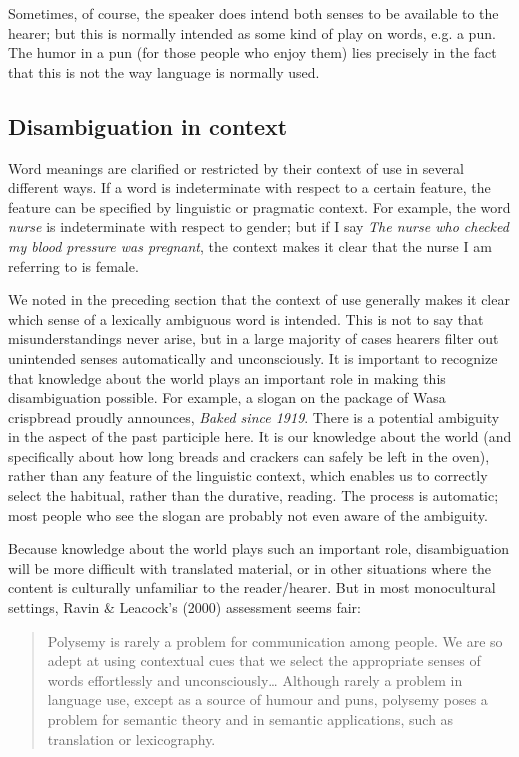 Sometimes, of course, the speaker does intend both senses to be available to the hearer; but this is normally intended as some kind of play on words, e.g. a pun. The humor in a pun (for those people who enjoy them) lies precisely in the fact that this is not the way language is normally used.


\subsection{Disambiguation in context}\label{sec:} %

Word meanings are clarified or restricted by their context of use in several different ways. If a word is indeterminate with respect to a certain feature, the feature can be specified by linguistic or pragmatic context. For example, the word \textit{nurse} is indeterminate with respect to gender; but if I say \textit{The nurse who checked my blood pressure was pregnant}, the context makes it clear that the nurse I am referring to is female.



We noted in the preceding section that the context of use generally makes it clear which sense of a lexically ambiguous word is intended. This is not to say that misunderstandings never arise, but in a large majority of cases hearers filter out unintended senses automatically and unconsciously. It is important to recognize that knowledge about the world plays an important role in making this disambiguation possible. For example, a slogan on the package of Wasa crispbread proudly announces, \textit{Baked since 1919}. There is a potential ambiguity in the aspect of the past participle here. It is our knowledge about the world (and specifically about how long breads and crackers can safely be left in the oven), rather than any feature of the linguistic context, which enables us to correctly select the habitual, rather than the durative, reading. The process is automatic; most people who see the slogan are probably not even aware of the ambiguity.



Because knowledge about the world plays such an important role, disambiguation will be more difficult with translated material, or in other situations where the content is culturally unfamiliar to the reader/hearer. But in most monocultural settings, Ravin \& Leacock’s (2000) assessment seems fair:


\begin{quote}
Polysemy is rarely a problem for communication among people. We are so adept at using contextual cues that we select the appropriate senses of words effortlessly and unconsciously… Although rarely a problem in language use, except as a source of humour and puns, polysemy poses a problem for semantic theory and in semantic applications, such as translation or lexicography.
\end{quote}


